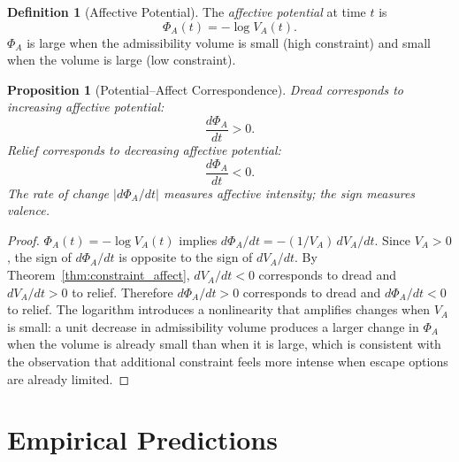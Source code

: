 \documentclass[12pt, a4paper]{article}
\theoremstyle{plain}
\newtheorem{proposition}[theorem]{Proposition}
\theoremstyle{definition}
\newtheorem{definition}[theorem]{Definition}
\theoremstyle{remark}
\begin{document}
\begin{definition}[Affective Potential]
\label{def:affect_potential}
  The \emph{affective potential} at time $t$ is
  \begin{equation}
    \Phi_A(t) = -\log V_A(t).
  \end{equation}
  $\Phi_A$ is large when the admissibility volume is small
  (high constraint) and small when the volume is large
  (low constraint).
\end{definition}

\begin{proposition}[Potential--Affect Correspondence]
\label{prop:potential_affect}
  Dread corresponds to increasing affective potential:
  \begin{equation}
    \frac{d\Phi_A}{dt} > 0.
  \end{equation}
  Relief corresponds to decreasing affective potential:
  \begin{equation}
    \frac{d\Phi_A}{dt} < 0.
  \end{equation}
  The rate of change $|d\Phi_A/dt|$ measures affective
  intensity; the sign measures valence.
\end{proposition}

\begin{proof}
  $\Phi_A(t) = -\log V_A(t)$ implies $d\Phi_A/dt =
  -(1/V_A)\, dV_A/dt$. Since $V_A > 0$, the sign of
  $d\Phi_A/dt$ is opposite to the sign of $dV_A/dt$.
  By Theorem~\ref{thm:constraint_affect}, $dV_A/dt < 0$
  corresponds to dread and $dV_A/dt > 0$ to relief.
  Therefore $d\Phi_A/dt > 0$ corresponds to dread and
  $d\Phi_A/dt < 0$ to relief. The logarithm introduces
  a nonlinearity that amplifies changes when $V_A$ is
  small: a unit decrease in admissibility volume produces
  a larger change in $\Phi_A$ when the volume is already
  small than when it is large, which is consistent with
  the observation that additional constraint feels more
  intense when escape options are already limited.
\end{proof}

\section{Empirical Predictions}
\label{sec:empirical}
\end{document}

